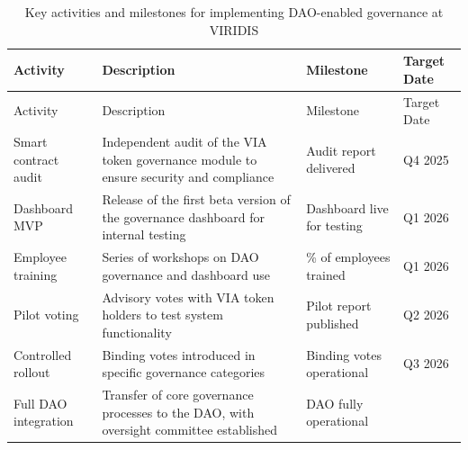 \documentclass[
  english,
  12pt,
  oneside,
  open=any]{scrbook}
\begin{document}
\begin{longtable}[]{@{}
  >{\raggedright\arraybackslash}p{}
  >{\raggedright\arraybackslash}p{}
  >{\raggedright\arraybackslash}p{}
  >{\raggedright\arraybackslash}p{}@{}}
\caption{Key activities and milestones for implementing DAO-enabled
governance at VIRIDIS}\label{tbl-milestones}\tabularnewline
\toprule\noalign{}
\begin{minipage}[b]{\linewidth}\raggedright
Activity
\end{minipage} & \begin{minipage}[b]{\linewidth}\raggedright
Description
\end{minipage} & \begin{minipage}[b]{\linewidth}\raggedright
Milestone
\end{minipage} & \begin{minipage}[b]{\linewidth}\raggedright
Target Date
\end{minipage} \\
\midrule\noalign{}
\endfirsthead
\toprule\noalign{}
\begin{minipage}[b]{\linewidth}\raggedright
Activity
\end{minipage} & \begin{minipage}[b]{\linewidth}\raggedright
Description
\end{minipage} & \begin{minipage}[b]{\linewidth}\raggedright
Milestone
\end{minipage} & \begin{minipage}[b]{\linewidth}\raggedright
Target Date
\end{minipage} \\
\midrule\noalign{}
\endhead
\bottomrule\noalign{}
\endlastfoot
Smart contract audit & Independent audit of the VIA token governance
module to ensure security and compliance & Audit report delivered & Q4
2025 \\
Dashboard MVP & Release of the first beta version of the governance
dashboard for internal testing & Dashboard live for testing & Q1 2026 \\
Employee training & Series of workshops on DAO governance and dashboard
use & 90\% of employees trained & Q1 2026 \\
Pilot voting & Advisory votes with VIA token holders to test system
functionality & Pilot report published & Q2 2026 \\
Controlled rollout & Binding votes introduced in specific governance
categories & Binding votes operational & Q3 2026 \\
Full DAO integration & Transfer of core governance processes to the DAO,
with oversight committee established & DAO fully operational & 2027 \\
\end{longtable}
\end{document}
